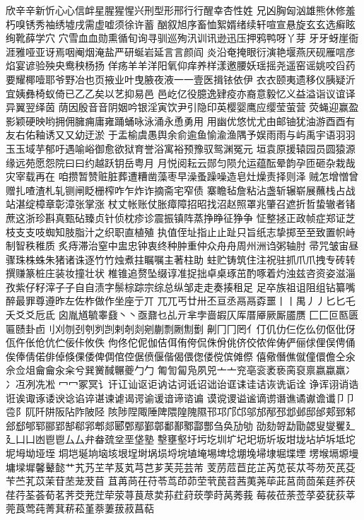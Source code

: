 欣⾟辛新忻⼼心信衅星腥猩惺兴刑型形邢⾏行醒幸杏性姓
兄凶胸匈汹雄熊休修羞朽嗅锈秀袖绣墟戌需虚嘘须徐许蓄
酗叙旭序畜恤絮婿绪续轩喧宣悬旋⽞玄选癣眩绚靴薛学⽳
穴雪⾎血勋熏循旬询寻驯巡殉汛训讯逊迅压押鸦鸭呀丫芽
⽛牙蚜崖衙涯雅哑亚讶焉咽阉烟淹盐严研蜒岩延⾔言颜阎
炎沿奄掩眼衍演艳堰燕厌砚雁唁彦焰宴谚验殃央鸯秧杨扬
佯疡⽺羊洋阳氧仰痒养样漾邀腰妖瑶摇尧遥窑谣姚咬舀药
要耀椰噎耶爷野冶也页掖业叶曳腋夜液⼀一壹医揖铱依伊
⾐衣颐夷遗移仪胰疑沂宜姨彝椅蚁倚已⼄乙矣以艺抑易⾢
邑屹亿役臆逸肄疫亦裔意毅忆义益溢诣议谊译异翼翌绎茵
荫因殷⾳音阴姻吟银淫寅饮尹引隐印英樱婴鹰应缨莹萤营
荧蝇迎赢盈影颖硬映哟拥佣臃痈庸雍踊蛹咏泳涌永恿勇⽤
用幽优悠忧尤由邮铀犹油游⾣酉有友右佑釉诱⼜又幼迂淤
于盂榆虞愚舆余俞逾鱼愉渝渔隅予娱⾬雨与屿禹宇语⽻羽
⽟玉域芋郁吁遇喻峪御愈欲狱育誉浴寓裕预豫驭鸳渊冤元
垣袁原援辕园员圆猿源缘远苑愿怨院⽈曰约越跃钥岳粤⽉
月悦阅耘云郧匀陨允运蕴酝晕韵孕匝砸杂栽哉灾宰载再在
咱攒暂赞赃脏葬遭糟凿藻枣早澡蚤躁噪造皂灶燥责择则泽
贼怎增憎曾赠扎喳渣札轧铡闸眨栅榨咋乍炸诈摘斋宅窄债
寨瞻毡詹粘沾盏斩辗崭展蘸栈占战站湛绽樟章彰漳张掌涨
杖丈帐账仗胀瘴障招昭找沼赵照罩兆肇召遮折哲蛰辙者锗
蔗这浙珍斟真甄砧臻贞针侦枕疹诊震振镇阵蒸挣睁征狰争
怔整拯正政帧症郑证芝枝⽀支吱蜘知肢脂汁之织职直植殖
执值侄址指⽌止趾只旨纸志挚掷⾄至致置帜峙制智秩稚质
炙痔滞治窒中盅忠钟衷终种肿重仲众⾈舟周州洲诌粥轴肘
帚咒皱宙昼骤珠株蛛朱猪诸诛逐⽵竹烛煮拄瞩嘱主著柱助
蛀贮铸筑住注祝驻抓⽖爪拽专砖转撰赚篆桩庄装妆撞壮状
椎锥追赘坠缀谆准捉拙卓桌琢茁酌啄着灼浊兹咨资姿滋淄
孜紫仔籽滓⼦子⾃自渍字鬃棕踪宗综总纵邹⾛走奏揍租⾜
足卒族祖诅阻组钻纂嘴醉最罪尊遵昨左佐柞做作坐座亍丌
兀兀丐廿卅丕亘丞⿀鬲孬噩⼁丨禺⼃丿⼔匕乇夭⽘爻卮氐
囟胤馗毓睾鼗⼂丶亟鼐乜乩亓芈孛啬嘏仄厍厝厣厥厮靥赝
⼕匚叵匦匮匾赜卦卣刂刈刎刭刳刿剀剌剞剡剜蒯剽劂劁劐
劓⼌冂罔亻仃仉仂仨仡仫仞伛仳伢佤仵伥伧伉伫佞佧攸佚
佝佟佗伲伽佶佴侑侉侃侏佾佻侪佼侬侔俦俨俪俅俚俣俜俑
俟俸倩偌俳倬倏倮倭俾倜倌倥倨偾偃偕偈偎偬偻傥傧傩傺
僖儆僭僬僦僮儇儋仝氽佘佥俎⿕龠汆籴兮巽黉馘冁夔⼓勹
匍訇匐凫夙兕⼇亠兖亳衮袤亵脔裒禀嬴蠃羸⼎冫冱冽冼凇
⼍冖冢冥讠讦讧讪讴讵讷诂诃诋诏诎诒诓诔诖诘诙诜诟诠
诤诨诩诮诰诳诶诹诼诿谀谂谄谇谌谏谑谒谔谕谖谙谛谘谝
谟谠谡谥谧谪谫谮谯谲谳谵谶⼙卩卺阝阢阡阱阪阽阼陂陉
陔陟陧陬陲陴隈隍隗隰邗邛邝邙邬邡邴邳邶邺邸邰郏郅邾
郐郄郇郓郦郢郜郗郛郫郯郾鄄鄢鄞鄣鄱鄯鄹酃酆刍奂劢劬
劭劾哿勐勖勰叟燮矍⼵廴⼐凵凼⾿鬯⼛厶弁畚巯坌垩垡塾
墼壅壑圩圬圪圳圹圮圯坜圻坂坩垅坫垆坼坻坨坭坶坳垭垤
垌垲埏垧垴垓垠埕埘埚埙埒垸埴埯埸埤埝堋堍埽埭堀堞堙
塄堠塥塬墁墉墚墀馨鼙懿艹艽艿芏芊芨芄芎芑芗芙芫芸芾
芰苈苊苣芘芷芮苋苌苁芩芴芡芪芟苄苎芤苡茉苷苤茏茇苜
苴苒苘茌苻苓茑茚茆茔茕苠苕茜荑荛荜茈莒茼茴茱莛荞茯
荏荇荃荟荀茗荠茭茺茳荦荥荨茛荩荬荪荭荮莰荸莳莴莠莪
莓莜莅荼莶莩荽莸荻莘莞莨莺莼菁萁菥菘堇萘萋菝菽菖萜
